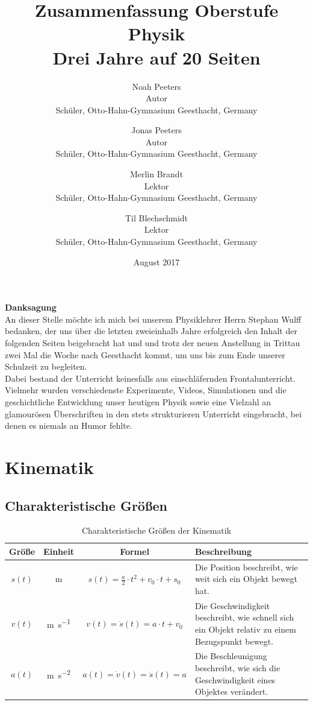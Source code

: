 \documentclass[a4paper]{article}
\title{Zusammenfassung Oberstufe Physik\\Drei Jahre auf 20 Seiten}
\author{Noah Peeters\\ Autor\\ \small{Schüler, Otto-Hahn-Gymnasium Geesthacht, Germany} \and Jonas Peeters\\Autor\\ \small{Schüler, Otto-Hahn-Gymnasium Geesthacht, Germany} \and Merlin Brandt\\ Lektor\\\small{Schüler, Otto-Hahn-Gymnasium Geesthacht, Germany} \and Til Blechschmidt\\Lektor\\ \small{Schüler, Otto-Hahn-Gymnasium Geesthacht, Germany} }
\date{August 2017}
\begin{document}
	
	
	\maketitle
	
	
	\newpage
	

	\begin{center}
		
		{\LARGE \textbf{Danksagung}\\[30pt]}
		An dieser Stelle möchte ich mich bei unserem Physiklehrer Herrn Stephan Wulff bedanken, der uns über die letzten zweieinhalb Jahre erfolgreich den Inhalt der folgenden Seiten beigebracht hat und und trotz der neuen Anstellung in Trittau zwei Mal die Woche nach Geesthacht kommt, um uns bis zum Ende unserer Schulzeit zu begleiten.\\
		Dabei bestand der Unterricht keinesfalls aus einschläfernden Frontalunterricht. Vielmehr wurden verschiedenste Experimente, Videos, Simulationen und die geschichtliche Entwicklung unser heutigen Physik sowie eine Vielzahl an glamourösen Überschriften in den stets strukturieren Unterricht eingebracht, bei denen es niemals an Humor fehlte.
	\end{center}
	
	\newpage
	
	
	
	\tableofcontents
	\listoffigures
	\listoftables
	\newpage
	
	\section{Kinematik}
		\subsection{Charakteristische Größen}
			\begin{table}[H]
				\def\arraystretch{1.5}
				\begin{tabularx}{\textwidth}{|c|c|c|X|}\hline
					Größe & Einheit & Formel & Beschreibung \\\hline
					$s(t)$ & \si{\meter} & $s(t) = \frac{a}{2}\cdot t^2+v_0\cdot t+s_0$ & Die Position beschreibt, wie weit sich ein Objekt bewegt hat.\\\hline
					$v(t)$ & \si{\meter\per\second}  & $v(t) = \dot{s}(t) = a\cdot t+v_0$ & Die Geschwindigkeit beschreibt, wie schnell sich ein Objekt relativ zu einem Bezugspunkt bewegt.\\\hline
					$a(t)$ & \si{\meter\per\second\squared} & $a(t) = \dot{v}(t) = \ddot{s}(t) = a$ & Die Beschleunigung beschreibt, wie sich die Geschwindigkeit eines Objektes verändert.\\\hline
				\end{tabularx}
				\caption {Charakteristische Größen der Kinematik}
				\label{table:kinematik_grossen}
			\end{table}
		
\end{document}
